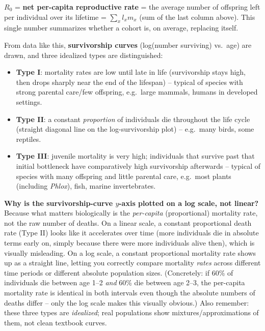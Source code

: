 \documentclass[11pt,a4paper]{article}
\begin{document}
\begin{keybox}
$R_0$ = \textbf{net per-capita reproductive rate} = the average number of offspring left per individual over its lifetime = $\sum_x l_x m_x$ (sum of the last column above). This single number summarizes whether a cohort is, on average, replacing itself.
\end{keybox}

From data like this, \textbf{survivorship curves} (log(number surviving) vs.\ age) are drawn, and three idealized types are distinguished:
\begin{itemize}[leftmargin=1.5em]
\item \textbf{Type I}: mortality rates are low until late in life (survivorship stays high, then drops sharply near the end of the lifespan) -- typical of species with strong parental care/few offspring, e.g.\ large mammals, humans in developed settings.
\item \textbf{Type II}: a constant \emph{proportion} of individuals die throughout the life cycle (straight diagonal line on the log-survivorship plot) -- e.g.\ many birds, some reptiles.
\item \textbf{Type III}: juvenile mortality is very high; individuals that survive past that initial bottleneck have comparatively high survivorship afterwards -- typical of species with many offspring and little parental care, e.g.\ most plants (including \textit{Phlox}), fish, marine invertebrates.
\end{itemize}

\begin{exambox}
\textbf{Why is the survivorship-curve $y$-axis plotted on a log scale, not linear?} Because what matters biologically is the \emph{per-capita} (proportional) mortality rate, not the raw number of deaths. On a linear scale, a constant proportional death rate (Type II) looks like it accelerates over time (more individuals die in absolute terms early on, simply because there were more individuals alive then), which is visually misleading. On a log scale, a constant proportional mortality rate shows up as a straight line, letting you correctly compare mortality \emph{rates} across different time periods or different absolute population sizes. (Concretely: if 60\% of individuals die between age 1--2 \emph{and} 60\% die between age 2--3, the per-capita mortality rate is identical in both intervals even though the absolute numbers of deaths differ -- only the log scale makes this visually obvious.) Also remember: these three types are \emph{idealized}; real populations show mixtures/approximations of them, not clean textbook curves.
\end{exambox}
\end{document}
